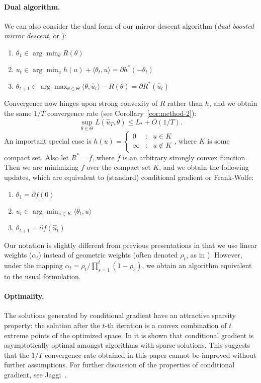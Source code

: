 \documentclass{article} %
\begin{document}
\paragraph{Dual algorithm.}
We can also consider the dual form of our mirror descent algorithm 
({\em dual boosted mirror descent}, or \dual):
\begin{enumerate}
\item $\theta_1 \in \arg\min_{\theta} R(\theta)$
\item $u_t \in \arg\min_{u} h(u) + \langle \theta_t, u \rangle = \partial h^{*}(-\theta_{t})$
\item $\theta_{t+1} \in \arg\max_{\theta \in \Theta} \langle \theta, \hat{u}_t \rangle - R(\theta) = \partial R^{*}(\hat u_{t})$
\end{enumerate}
Convergence now hinges upon strong convexity of $R$ rather than 
$h$, and we obtain the same $1/T$ convergence 
rate (see Corollary~\ref{cor:method-2}):
\[ \sup_{\theta \in \Theta} L(\hat{u}_T, \theta) \leq L_{*} + O(1/T). \]
An important special case is $h(u) = \left\{ \begin{array}{ccl} 0 & : & u \in K \\ \infty & : & u \not\in K \end{array} \right.$, where $K$ is some 
compact set. Also let $R^* = f$, where $f$ is an arbitrary strongly convex 
function. Then we are minimizing $f$ over the compact set $K$, and we obtain 
the following updates, which are equivalent to (standard) conditional gradient 
or Frank-Wolfe:
\begin{enumerate}
\item $\theta_1 = \partial f(0)$
\item $u_t \in \arg\min_{u \in K} \langle \theta_t, u \rangle$
\item $\theta_{t+1} = \partial f(\hat{u}_t)$
\end{enumerate}
Our notation is slightly different from previous presentations in 
that we use linear weights ($\alpha_t$) instead of geometric weights 
(often denoted $\rho_t$, as in \cite{Bach:2012b}). However, under the 
mapping $\alpha_t = \rho_t/\prod_{s=1}^t (1-\rho_s)$, we obtain an 
algorithm equivalent to the usual formulation.

\paragraph{Optimality.}
The solutions generated by conditional gradient have 
an attractive sparsity property: the solution after the $t$-th iteration is 
a convex combination of $t$ extreme points of the optimized space. In 
\cite{Jaggi:2013} it is shown that conditional gradient is asymptotically 
optimal amongst algorithms with sparse solutions. This 
suggests that the $1/T$ convergence rate obtained in this paper cannot be 
improved without further assumptions. For further discussion of the properties 
of conditional gradient, see Jaggi~\cite{Jaggi:2013}.
\end{document}
